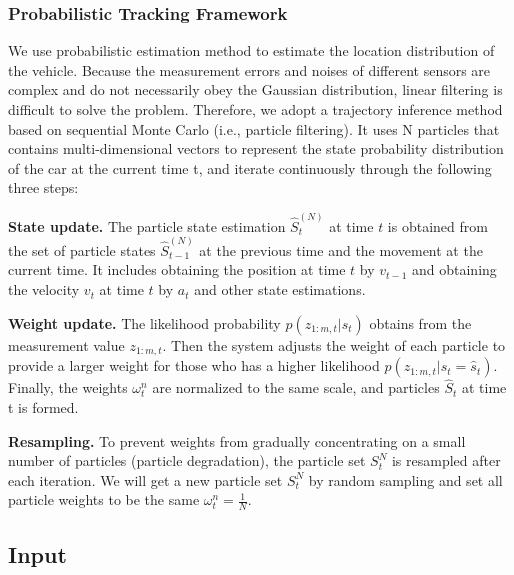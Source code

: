 \documentclass[journal]{IEEEtran}
\begin{document}
\subsubsection{Probabilistic Tracking Framework}
 We use probabilistic estimation method to estimate the location distribution of the vehicle. Because the measurement errors and noises of different sensors are complex and do not necessarily obey the Gaussian distribution, linear filtering is difficult to solve the problem. Therefore, we adopt a trajectory inference method based on sequential Monte Carlo (i.e., particle filtering). It uses N particles that contains multi-dimensional vectors to represent the state probability distribution of the car at the current time t, and iterate continuously through the following three steps\cite{du2019enhanced}:

\textbf{State update.} 
The particle state estimation $\hat{S}_{t}^{(N)}$ at time $t$ is obtained from the set of particle states $\hat{S}_{t-1}^{(N)}$ at the previous time and the movement at the current time. It includes obtaining the position at time $t$ by $v_{t-1}$ and obtaining the velocity $v_{t}$ at time $t$ by $a_{t}$ and other state estimations.

\textbf{Weight update.}
The likelihood probability $p(z_{1:m,t}|\hat{s}_t)$ obtains from the measurement value $z_{1:m,t}$. Then the system adjusts the weight of each particle to provide a larger weight for those who has a higher likelihood $p(z_{1:m,t}|s_t = \hat{s}_t)$. Finally, the weights $\omega_{t}^{n}$ are normalized to the same scale, and particles $\hat{S}_t$ at time t is formed.

\textbf{Resampling.}
To prevent weights from gradually concentrating on a small number of particles (particle degradation), the particle set $S_{t}^{N}$ is resampled after each iteration. We will get a new particle set $S_{t}^{N}$ by random sampling and set all particle weights to be the same $\omega_{t}^{n} = \frac{1}{N}$.

\subsection{Input}
\end{document}
